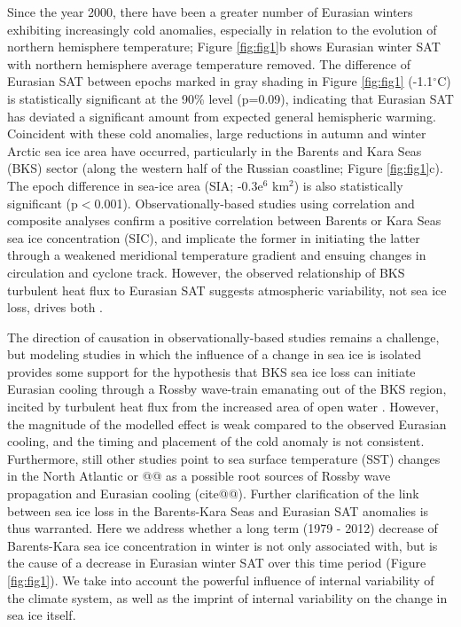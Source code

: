 \documentclass{nature}
\begin{document}
Since the year 2000, there have been a greater number of Eurasian winters exhibiting increasingly cold anomalies, especially in relation to the evolution of northern hemisphere temperature; Figure \ref{fig:fig1}b shows Eurasian winter SAT with northern hemisphere average temperature removed. The difference of Eurasian SAT between epochs marked in gray shading in Figure \ref{fig:fig1} (-1.1$^\circ$C) is statistically significant at the 90\% level (p=0.09), indicating that Eurasian SAT has deviated a significant amount from expected general hemispheric warming. Coincident with these cold anomalies, large reductions in autumn and winter Arctic sea ice area have occurred, particularly in the Barents and Kara Seas (BKS) sector (along the western half of the Russian coastline; Figure \ref{fig:fig1}c). The epoch difference in sea-ice area (SIA; -0.3e$^6$ km$^2$) is also statistically significant (p$<$0.001). Observationally-based studies using correlation and composite analyses confirm a positive correlation between Barents \cite{inoue12} or Kara \cite{outten12} Seas sea ice concentration (SIC), and implicate the former in initiating the latter through a weakened meridional temperature gradient and ensuing changes in circulation and cyclone track. However, the observed relationship of BKS turbulent heat flux to Eurasian SAT suggests atmospheric variability, not sea ice loss, drives both \cite{sorokina15}. 

The direction of causation in observationally-based studies remains a challenge, but modeling studies in which the influence of a change in sea ice is isolated provides some support for the hypothesis that BKS sea ice loss can initiate Eurasian cooling through a Rossby wave-train emanating out of the BKS region, incited by turbulent heat flux from the increased area of open water \cite{honda09,petoukhov10,mori14,kim14,peings14}. However, the magnitude of the modelled effect is weak compared to the observed Eurasian cooling, and the timing and placement of the cold anomaly is not consistent. Furthermore, still other studies point to sea surface temperature (SST) changes in the North Atlantic or @@ as a possible root sources of Rossby wave propagation and Eurasian cooling (cite@@). Further clarification of the link between sea ice loss in the Barents-Kara Seas and Eurasian SAT anomalies is thus warranted. Here we address whether a long term (1979 - 2012) decrease of Barents-Kara sea ice concentration in winter is not only associated with, but is the cause of a decrease in Eurasian winter SAT over this time period (Figure \ref{fig:fig1}). We take into account the powerful influence of internal variability of the climate system, as well as the imprint of internal variability on the change in sea ice itself. 
\end{document}
